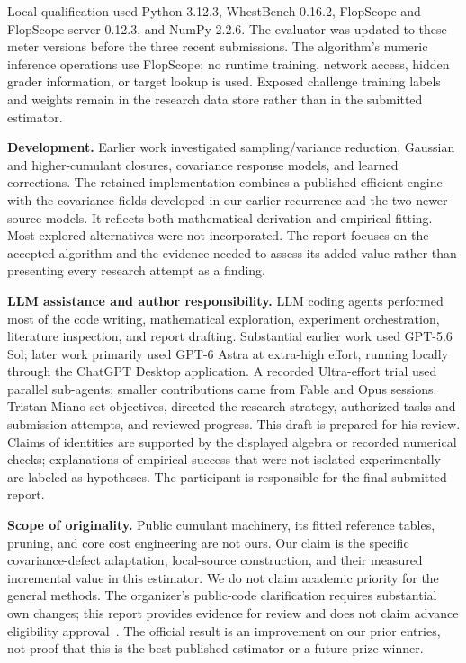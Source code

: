 \documentclass[10pt]{article}
\begin{document}
Local qualification used Python 3.12.3, WhestBench 0.16.2, FlopScope and
FlopScope-server 0.12.3, and NumPy 2.2.6. The evaluator was updated to these
meter versions before the three recent submissions. The algorithm's numeric
inference operations use FlopScope; no runtime training, network access,
hidden grader information, or target lookup is used. Exposed challenge training
labels and weights remain in the research data store rather than in the
submitted estimator.

\textbf{Development.} Earlier work investigated sampling/variance reduction,
Gaussian and higher-cumulant closures, covariance response models, and learned
corrections. The retained implementation combines a published efficient
engine with the covariance fields developed in our earlier recurrence and
the two newer source models. It reflects both mathematical derivation and
empirical fitting. Most explored alternatives were not incorporated. The
report focuses on the accepted algorithm and the evidence needed to assess
its added value rather than presenting every research attempt as a finding.

\textbf{LLM assistance and author responsibility.} LLM coding agents performed
most of the code writing, mathematical exploration, experiment orchestration,
literature inspection, and report drafting. Substantial earlier work used
GPT-5.6 Sol; later work primarily used GPT-6 Astra at extra-high effort,
running locally through the ChatGPT Desktop application. A recorded
Ultra-effort trial used parallel sub-agents; smaller contributions came from
Fable and Opus sessions. Tristan Miano set objectives, directed the research
strategy, authorized tasks and submission attempts, and reviewed progress.
This draft is prepared for his review. Claims of identities are supported by
the displayed algebra or recorded numerical checks; explanations of empirical
success that were not isolated experimentally are labeled as hypotheses.
The participant is responsible for the final submitted report.

\textbf{Scope of originality.} Public cumulant machinery, its fitted reference
tables, pruning, and core cost engineering are not ours. Our claim is the
specific covariance-defect adaptation, local-source construction, and their
measured incremental value in this estimator. We do not claim academic
priority for the general methods. The organizer's public-code clarification
requires substantial own changes; this report provides evidence for review
and does not claim advance eligibility approval~\cite{reuse}. The official
result is an improvement on our prior entries, not proof that this is the
best published estimator or a future prize winner.
\end{document}
